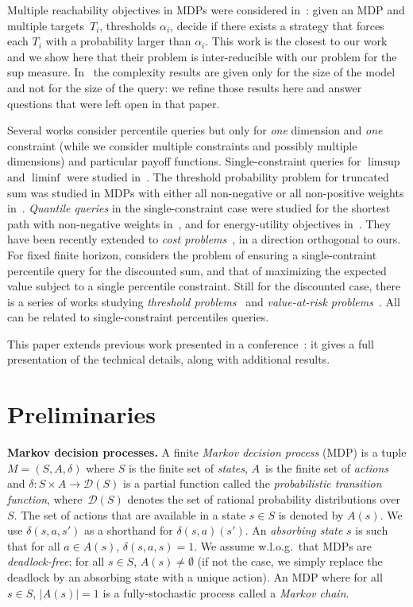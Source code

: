 \documentclass{llncs}
\newcommand{\states}{\ensuremath{S} }
\newcommand{\state}{\ensuremath{s} }
\newcommand\calD{\ensuremath{\mathcal{D}}}
\begin{document}
Multiple reachability objectives in MDPs were considered in~\cite{EKVY-lmcs08}: given an MDP and multiple targets~$T_i$, thresholds $\alpha_i$, decide if there exists a strategy that forces each $T_i$ with a probability larger than $\alpha_i$. This work is the closest to our work and we show here that their problem is inter-reducible with our problem for the sup measure. In~\cite{EKVY-lmcs08} the complexity results are given only for the size of the model and not for the size of the query: we refine those results here and answer questions that were left open in that paper.

Several works consider percentile queries but only for \textit{one} dimension and {\em one} constraint (while we consider multiple constraints and possibly multiple dimensions) and particular payoff functions. Single-constraint queries for $\limsup$ and $\liminf$ were studied in~\cite{CH-ilc09}. 
The threshold probability problem for truncated sum was studied in MDPs with either all non-negative or all non-positive weights in~\cite{Ohtsubo-amc2004,SO-jcta13}. \textit{Quantile queries} in the single-constraint case were studied for
the shortest path with non-negative weights 
in~\cite{DBLP:conf/fossacs/UmmelsB13}, and for
energy-utility objectives in~\cite{BDDKK-fm14}. They have been recently extended to \textit{cost problems}~\cite{HaaseK14}, in a direction orthogonal to ours. For fixed finite horizon, \cite{XM-ijcai11} considers the problem of ensuring a single-contraint percentile query for the discounted sum, and that of maximizing the expected value subject to a single percentile constraint. Still for the discounted case, there is a series of works studying \textit{threshold problems}~\cite{White1993634,WL99} and \textit{value-at-risk problems}~\cite{DBLP:conf/fsttcs/BrazdilCFNS13}. All can be related to single-constraint percentiles queries.

This paper extends previous work presented in a conference~\cite{RRS-cav15}: it gives a full presentation of the technical details, along with additional results.
 
\section{Preliminaries}

\smallskip\noindent\textbf{Markov decision processes.} A finite \textit{Markov decision process} (MDP) is a tuple $M = (S,A,\delta)$ where
$S$ is the finite set of \emph{states}, $A$~is the finite set of \emph{actions} and $\delta\colon S\times A \rightarrow \calD(S)$
is a partial function called the \emph{probabilistic transition function}, where~$\calD(S)$ denotes the set of rational probability distributions over~$S$.
The set of actions that are available in a state $\state \in \states$ is denoted by $A(s)$. 
We use $\delta(s,a,s')$ as a shorthand for $\delta(s,a)(s')$.
An \emph{absorbing state} $s$ is such that for all $a \in A(s)$, $\delta(s,a,s) = 1$. We assume w.l.o.g.~that MDPs are \textit{deadlock-free}: for all $s \in S$, $A(s) \neq \emptyset$ (if not the case, we simply replace the deadlock by an absorbing state with a unique action). An MDP where for all $s \in \states$, $\vert A(s)\vert = 1$ is a fully-stochastic process called a \textit{Markov chain}.
\end{document}
